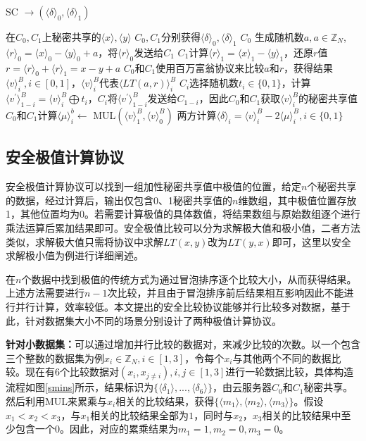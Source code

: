 \begin{algorithm}[htbp]
	\renewcommand{\algorithmicrequire}{\textbf{输入:}}
	\renewcommand{\algorithmicensure}{\textbf{输出:}}
	\caption{SC $\rightarrow (\langle \delta \rangle_0, \langle \delta \rangle_1)$}
	\label{alg_sc}
	\begin{algorithmic}[1]
		\REQUIRE 在$C_0,C_1$上秘密共享的$ \langle x \rangle, \langle y \rangle $
		\ENSURE $C_0,C_1$分别获得$\langle \delta\rangle_0, \langle \delta\rangle_1$
		\STATE $C_0$ 生成随机数$a, a\in \mathbb{Z}_N$, $\langle r \rangle_0=\langle x \rangle_0-\langle y\rangle_0+a$，将$\langle r \rangle_0$发送给$C_1$
		\STATE $C_1$计算$\langle r \rangle_1 = \langle x \rangle_1-\langle y\rangle_1$，还原$r$值$r=\langle r \rangle_0 + \langle r \rangle_1 = x-y+a$
		\STATE $C_0$和$C_1$使用百万富翁协议来比较$a$和$r$，获得结果$\langle v \rangle_i^B, i\in[0,1]$，$\langle v \rangle_i^B$代表$\langle LT(a,r)\rangle_i^B$
		\STATE $C_i$选择随机数$t_i \in \{0,1\}$，计算$\langle v^{'}\rangle_{1-i}^B=\langle v \rangle_i^B \bigoplus  t_i$，$C_i$将$\langle v^{'}\rangle_{1-i}^B$发送给$C_{1-i}$，因此$C_0$和$C_1$获取$\langle v \rangle_i^B$的秘密共享值
		\STATE $C_0$和$C_1$计算$\langle\mu \rangle_i^b \leftarrow$ MUL$(\langle v\rangle_1^B,\langle v\rangle_0^B)$
		\STATE 两方计算$ \langle \delta \rangle_i= \langle v \rangle_i^B -  2\langle\mu \rangle_i^B,i\in\{0, 1\}$
		
	\end{algorithmic}
\end{algorithm}
\subsection{安全极值计算协议}
\label{s3-secureminimum}
安全极值计算协议可以找到一组加性秘密共享值中极值的位置，给定$ n $个秘密共享的数据，经过计算后，输出仅包含0、1秘密共享值的$n$维数组，其中极值位置存放1，其他位置均为0。若需要计算极值的具体数值，将结果数组与原始数组逐个进行乘法运算后累加结果即可。安全极值比较可以分为求解极大值和极小值，二者方法类似，求解极大值只需将协议中求解$LT(x,y)$改为$LT(y,x)$即可，这里以安全求解极小值为例进行详细阐述。

在$n$个数据中找到极值的传统方式为通过冒泡排序逐个比较大小，从而获得结果。上述方法需要进行$n-1$次比较，并且由于冒泡排序前后结果相互影响因此不能进行并行计算，效率较低。本文提出的安全比较协议能够并行比较多对数据，基于此，针对数据集大小不同的场景分别设计了两种极值计算协议。

\textbf{针对小数据集：}可以通过增加并行比较的数据对，来减少比较的次数。以一个包含三个整数的数据集为例$x_i \in \mathbb{Z}_N, i\in[1,3]$，令每个$x_i$与其他两个不同的数据比较。现在有6个比较数据对$(x_i, x_{j\neq i}), i,j \in [1,3] $进行一轮数据比较，具体构造流程如图\ref{smins}所示，结果标识为$\{\langle\delta_1\rangle,...,\langle\delta_6\rangle\}$，由云服务器$C_0$和$C_1$秘密共享。然后利用MUL来累乘与$x_i$相关的比较结果，获得$\{\langle m_1 \rangle,\langle m_2 \rangle,\langle m_3\rangle\}$。假设$x_1<x_2<x_3$，与$x_1$相关的比较结果全部为$1$，同时与$x_2$，$x_3$相关的比较结果中至少包含一个$0$。因此，对应的累乘结果为$m_1=1, m_2=0, m_3=0$。

